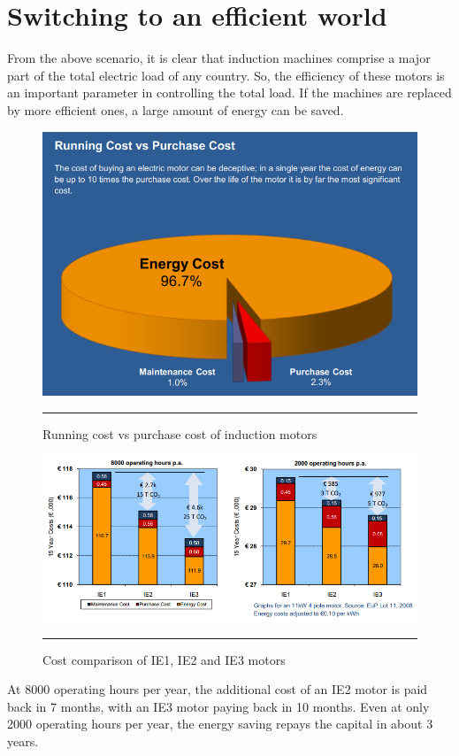 \section{Switching to an efficient world}
From the above scenario, it is clear that induction machines comprise a major part of the total electric load of any country. So, the efficiency of these motors is an important parameter in controlling the total load. If the machines are replaced by more efficient ones, a large amount of energy can be saved.
\begin{figure}[htbp]
  \centering
    \includegraphics[width = 5in]{./Figures/MS/fig11.png}
    \rule{35em}{1.2pt}
  \caption{Running cost vs purchase cost of induction motors}
  \label{fig:Running cost vs purchase cost of induction motors}
\end{figure}
\begin{figure}[htbp]
  \centering
    \includegraphics[width = 5in]{./Figures/MS/fig12.png}
    \rule{35em}{1.2pt}
  \caption{Cost comparison of IE1, IE2 and IE3 motors}
  \label{fig:Cost comparison of IE1, IE2 and IE3 motors}
\end{figure}
At 8000 operating hours per year, the additional cost of an IE2 motor is paid back in 7 months, with an IE3 motor paying back in 10 months. Even at only 2000 operating hours per year, the energy saving repays the capital in about 3 years\cite{caetano2018energy}.

